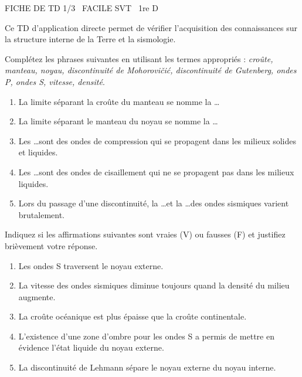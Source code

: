 \documentclass[11pt]{article}
\begin{document}
\begin{tcolorbox}[enhanced,colback=popink,colframe=popink,arc=10pt,boxrule=0pt,left=12pt,right=12pt,top=9pt,bottom=9pt]
{\color{white}\popxbold\small FICHE DE TD 1/3 \textbullet\ FACILE \hfill SVT \textbullet\ 1re D\par}
\end{tcolorbox}
\vspace{4pt}
Ce TD d'application directe permet de vérifier l'acquisition des connaissances sur la structure interne de la Terre et la sismologie.

\begin{exercice}
Complétez les phrases suivantes en utilisant les termes appropriés : \textit{croûte, manteau, noyau, discontinuité de Mohorovičić, discontinuité de Gutenberg, ondes P, ondes S, vitesse, densité}.
\begin{enumerate}
    \item La limite séparant la croûte du manteau se nomme la \ldots
    \item La limite séparant le manteau du noyau se nomme la \ldots
    \item Les \ldots sont des ondes de compression qui se propagent dans les milieux solides et liquides.
    \item Les \ldots sont des ondes de cisaillement qui ne se propagent pas dans les milieux liquides.
    \item Lors du passage d'une discontinuité, la \ldots et la \ldots des ondes sismiques varient brutalement.
\end{enumerate}
\end{exercice}

\begin{exercice}
Indiquez si les affirmations suivantes sont vraies (V) ou fausses (F) et justifiez brièvement votre réponse.
\begin{enumerate}
    \item Les ondes S traversent le noyau externe.
    \item La vitesse des ondes sismiques diminue toujours quand la densité du milieu augmente.
    \item La croûte océanique est plus épaisse que la croûte continentale.
    \item L'existence d'une zone d'ombre pour les ondes S a permis de mettre en évidence l'état liquide du noyau externe.
    \item La discontinuité de Lehmann sépare le noyau externe du noyau interne.
\end{enumerate}
\end{exercice}
\end{document}
